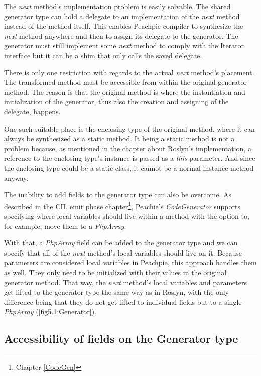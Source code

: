 The \emph{next} method's implementation problem is easily solvable. The shared generator type can hold a delegate to an implementation of the \emph{next} method instead of the method itself. This enables Peachpie compiler to synthesize the \emph{next} method anywhere and then to assign its delegate to the generator. The generator must still implement some \emph{next} method to comply with the Iterator interface but it can be a shim that only calls the saved delegate.

There is only one restriction with regards to the actual \emph{next} method’s placement. The transformed method must be accessible from within the original generator method. The reason is that the original method is where the instantiation and initialization of the generator, thus also the creation and assigning of the delegate, happens. 

One such suitable place is the enclosing type of the original method, where it can always be synthesized as a static method. It being a static method is not a problem because, as mentioned in the chapter about Roslyn’s implementation, a reference to the enclosing type’s instance is passed as a \emph{this} parameter. And since the enclosing type could be a static class, it cannot be a normal instance method anyway.

The inability to add fields to the generator type can also be overcome. As described in the CIL emit phase chapter\footnote{Chapter \ref{CodeGen}}, Peachie's \emph{CodeGenerator} supports specifying where local variables should live within a method with the option to, for example, move them to a \emph{PhpArray}.

With that, a \emph{PhpArray} field can be added to the generator type and we can specify that all of the \emph{next} method's local variables should live on it. Because parameters are considered local variables in Peachpie, this approach handles them as well. They only need to be initialized with their values in the original generator method. That way, the \emph{next} method’s local variables and parameters get lifted to the generator type the same way as in Roslyn, with the only difference being that they do not get lifted to individual fields but to a single \emph{PhpArray} (\autoref{fig5.1:Generator}).

\subsection{Accessibility of fields on the Generator type}

